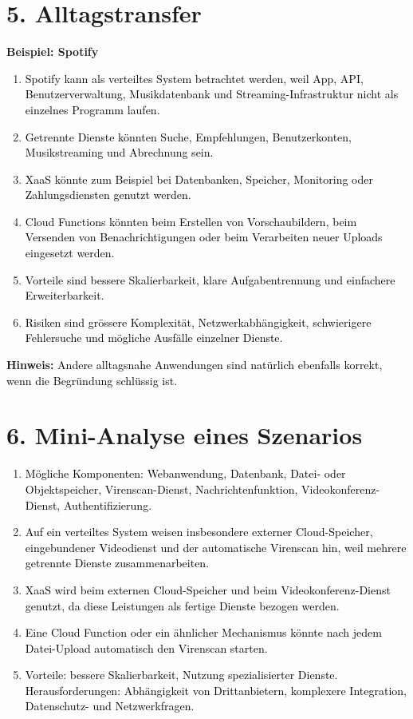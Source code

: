 \documentclass[11pt,a4paper]{article}
\newcommand{\solution}[1]{\textcolor{black}{#1}}
\begin{document}
\section*{5. Alltagstransfer}
\textbf{Beispiel: Spotify}
\begin{enumerate}
  \item \solution{Spotify kann als verteiltes System betrachtet werden, weil App, API, Benutzerverwaltung, Musikdatenbank und Streaming-Infrastruktur nicht als einzelnes Programm laufen.}
  \item \solution{Getrennte Dienste k\"onnten Suche, Empfehlungen, Benutzerkonten, Musikstreaming und Abrechnung sein.}
  \item \solution{XaaS k\"onnte zum Beispiel bei Datenbanken, Speicher, Monitoring oder Zahlungsdiensten genutzt werden.}
  \item \solution{Cloud Functions k\"onnten beim Erstellen von Vorschaubildern, beim Versenden von Benachrichtigungen oder beim Verarbeiten neuer Uploads eingesetzt werden.}
  \item \solution{Vorteile sind bessere Skalierbarkeit, klare Aufgabentrennung und einfachere Erweiterbarkeit.}
  \item \solution{Risiken sind gr\"ossere Komplexit\"at, Netzwerkabh\"angigkeit, schwierigere Fehlersuche und m\"ogliche Ausf\"alle einzelner Dienste.}
\end{enumerate}

\textbf{Hinweis:} \solution{Andere alltagsnahe Anwendungen sind nat\"urlich ebenfalls korrekt, wenn die Begr\"undung schl\"ussig ist.}

\section*{6. Mini-Analyse eines Szenarios}
\begin{enumerate}
  \item \solution{M\"ogliche Komponenten: Webanwendung, Datenbank, Datei- oder Objektspeicher, Virenscan-Dienst, Nachrichtenfunktion, Videokonferenz-Dienst, Authentifizierung.}
  \item \solution{Auf ein verteiltes System weisen insbesondere externer Cloud-Speicher, eingebundener Videodienst und der automatische Virenscan hin, weil mehrere getrennte Dienste zusammenarbeiten.}
  \item \solution{XaaS wird beim externen Cloud-Speicher und beim Videokonferenz-Dienst genutzt, da diese Leistungen als fertige Dienste bezogen werden.}
  \item \solution{Eine Cloud Function oder ein \"ahnlicher Mechanismus k\"onnte nach jedem Datei-Upload automatisch den Virenscan starten.}
  \item \solution{Vorteile: bessere Skalierbarkeit, Nutzung spezialisierter Dienste. Herausforderungen: Abh\"angigkeit von Drittanbietern, komplexere Integration, Datenschutz- und Netzwerkfragen.}
\end{enumerate}
\end{document}
